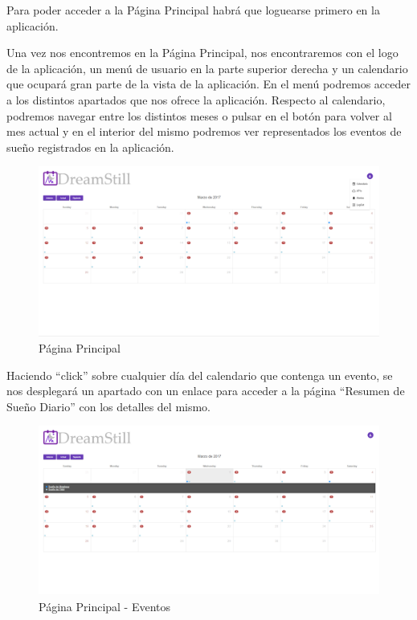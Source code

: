 \documentclass[11pt,openany]{book}
\begin{document}
Para poder acceder a la Página Principal habrá que loguearse primero en la aplicación.

Una vez nos encontremos en la Página Principal, nos encontraremos con el logo de la aplicación, un menú de usuario en la parte superior derecha y un calendario que ocupará gran parte de la vista de la aplicación. En el menú podremos acceder a los distintos apartados que nos ofrece la aplicación. Respecto al calendario, podremos navegar entre los distintos meses o pulsar en el botón para volver al mes actual y en el interior del mismo podremos ver representados los eventos de sueño registrados en la aplicación. 

\begin{figure}[H]
\centering
\includegraphics[totalheight=6cm]{manualUsuario/paginaPrincipal.png}
\caption{Página Principal}
\end{figure}

\pagebreak
Haciendo ``click'' sobre cualquier día del calendario que contenga un evento, se nos desplegará un apartado con un enlace para acceder a la página ``Resumen de Sueño Diario'' con los detalles del mismo.

\begin{figure}[H]
\centering
\includegraphics[totalheight=6cm]{manualUsuario/eventos.png}
\caption{Página Principal - Eventos}
\end{figure}
\end{document}
